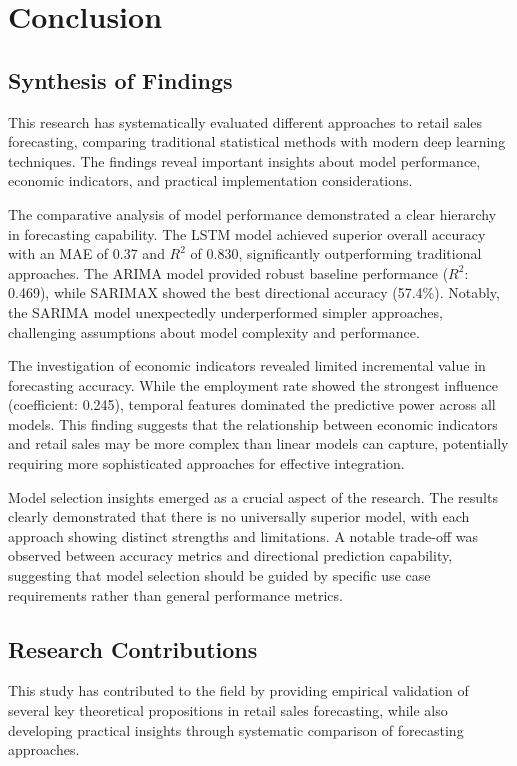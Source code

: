 \documentclass[12pt,a4paper]{report}
\begin{document}
\chapter{Conclusion}

\section{Synthesis of Findings}
This research has systematically evaluated different approaches to retail sales forecasting, comparing traditional statistical methods with modern deep learning techniques. The findings reveal important insights about model performance, economic indicators, and practical implementation considerations.

The comparative analysis of model performance demonstrated a clear hierarchy in forecasting capability. The LSTM model achieved superior overall accuracy with an MAE of 0.37 and $R^2$ of 0.830, significantly outperforming traditional approaches. The ARIMA model provided robust baseline performance ($R^2$: 0.469), while SARIMAX showed the best directional accuracy (57.4\%). Notably, the SARIMA model unexpectedly underperformed simpler approaches, challenging assumptions about model complexity and performance.

The investigation of economic indicators revealed limited incremental value in forecasting accuracy. While the employment rate showed the strongest influence (coefficient: 0.245), temporal features dominated the predictive power across all models. This finding suggests that the relationship between economic indicators and retail sales may be more complex than linear models can capture, potentially requiring more sophisticated approaches for effective integration.

Model selection insights emerged as a crucial aspect of the research. The results clearly demonstrated that there is no universally superior model, with each approach showing distinct strengths and limitations. A notable trade-off was observed between accuracy metrics and directional prediction capability, suggesting that model selection should be guided by specific use case requirements rather than general performance metrics.

\section{Research Contributions}
This study has contributed to the field by providing empirical validation of several key theoretical propositions in retail sales forecasting, while also developing practical insights through systematic comparison of forecasting approaches.
\end{document}
